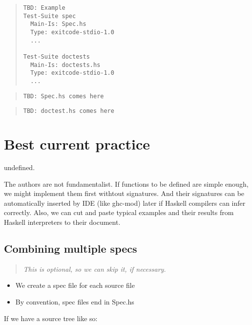 \documentclass[preprint]{sigplanconf}
\begin{document}
\begin{quote}
\begin{verbatim}
TBD: Example
Test-Suite spec
  Main-Is: Spec.hs
  Type: exitcode-stdio-1.0
  ...

Test-Suite doctests
  Main-Is: doctests.hs
  Type: exitcode-stdio-1.0
  ...
\end{verbatim}
\end{quote}

\begin{quote}
\begin{verbatim}
TBD: Spec.hs comes here
\end{verbatim}
\end{quote}

\begin{quote}
\begin{verbatim}
TBD: doctest.hs comes here
\end{verbatim}
\end{quote}


\section{Best current practice}

undefined.

The authors are not fundamentalist.
If functions to be defined are simple enough,
we might implement them first withtout signatures.
And their signatures can be automatically
inserted by IDE (like ghc-mod) later
if Haskell compilers can infer correctly.
Also, we can cut and paste typical examples and their results
from Haskell interpreters to their document.

\subsection{Combining multiple specs}

\begin{quote}
\emph{This is optional, so we can skip it, if necessary.}
\end{quote}

\begin{itemize}
\item We create a spec file for each source file
\item By convention, spec files end in Spec.hs
\end{itemize}

\noindent If we have a source tree like so:
\end{document}
